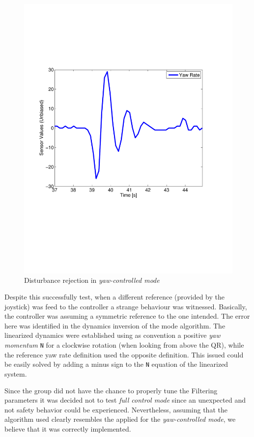 \documentclass{article}
\begin{document}
\begin{figure}[ht]
\centering
	\includegraphics[trim = 0mm 50mm 0mm 40mm, scale = .5]{Figures/YawControl}
	\caption{Disturbance rejection in \textit{yaw-controlled mode}}
	\label{fig:YawControl}
\end{figure}

Despite this successfully test, when a different reference (provided by the joystick) was feed to the controller a strange behaviour was witnessed. Basically, the controller was assuming a symmetric reference to the one intended. The error here was identified in the dynamics inversion of the mode algorithm. The linearized dynamics were established using as convention a positive \textit{yaw momentum} \texttt{N} for a clockwise rotation (when looking from above the QR), while the reference yaw rate definition used the opposite definition. This issued could be easily solved by adding a minus sign to the \texttt{N} equation of the linearized system.

Since the group did not have the chance to properly tune the Filtering parameters it was decided not to test \textit{full control mode} since an unexpected and not safety behavior could be experienced. Nevertheless, assuming that the algorithm used clearly resembles the applied for the \textit{yaw-controlled mode}, we believe that it was correctly implemented.
\end{document}
